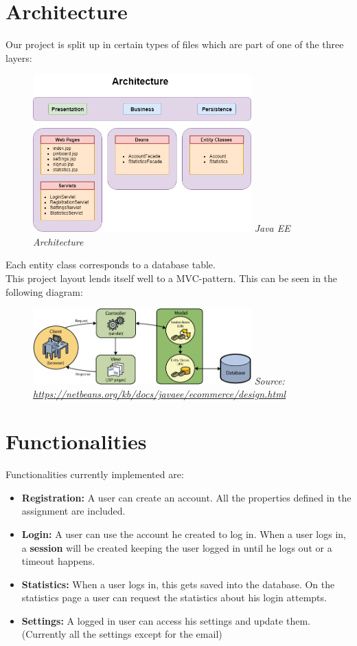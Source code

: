 \documentclass{article}
\begin{document}
\section{Architecture}
Our project is split up in certain types of files which are part of one of the three layers:
\begin{figure}[h]
\centering
\includegraphics[width=0.75\textwidth]{Architecture.png}
\small\textit{Java EE Architecture}
\end{figure}
Each entity class corresponds to a database table.
\\This project layout lends itself well to a MVC-pattern. This can be seen in the following diagram:
\begin{figure}[h]
\centering
\includegraphics[width=0.75\textwidth]{mvc-diagram.png}
\small\textit{Source:\url{ https://netbeans.org/kb/docs/javaee/ecommerce/design.html}}
\end{figure}
\section{Functionalities}
Functionalities currently implemented are:

\begin{itemize}
\item \textbf{Registration:} A user can create an account. All the properties defined in the assignment are included.
\item \textbf{Login:} A user can use the account he created to log in. When a user logs in, a \textbf{session} will be created keeping the user logged in until he logs out or a timeout happens.
\item \textbf{Statistics:} When a user logs in, this gets saved into the database. On the statistics page a user can request the statistics about his login attempts.
\item \textbf{Settings:} A logged in user can access his settings and update them. (Currently all the settings except for the email)
\end{itemize}
\end{document}
